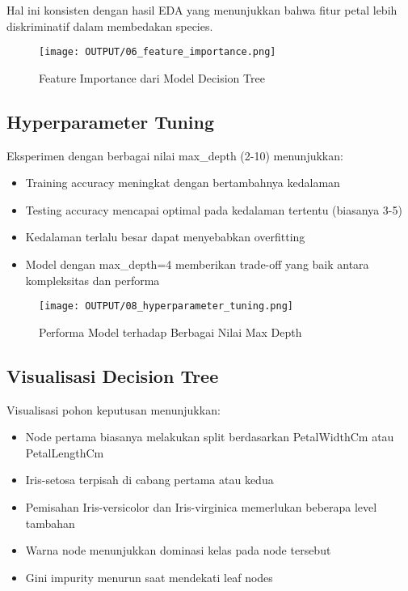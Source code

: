 \documentclass[11pt,a4paper]{article}
\begin{document}
Hal ini konsisten dengan hasil EDA yang menunjukkan bahwa fitur petal lebih diskriminatif dalam membedakan species.

\begin{figure}[h]
    \centering
    \texttt{[image: OUTPUT/06\_feature\_importance.png]}
    \caption{Feature Importance dari Model Decision Tree}
    \label{fig:feature_importance}
\end{figure}

\subsection{Hyperparameter Tuning}
Eksperimen dengan berbagai nilai max\_depth (2-10) menunjukkan:
\begin{itemize}
    \item Training accuracy meningkat dengan bertambahnya kedalaman
    \item Testing accuracy mencapai optimal pada kedalaman tertentu (biasanya 3-5)
    \item Kedalaman terlalu besar dapat menyebabkan overfitting
    \item Model dengan max\_depth=4 memberikan trade-off yang baik antara kompleksitas dan performa
\end{itemize}

\begin{figure}[h]
    \centering
    \texttt{[image: OUTPUT/08\_hyperparameter\_tuning.png]}
    \caption{Performa Model terhadap Berbagai Nilai Max Depth}
    \label{fig:hyperparameter_tuning}
\end{figure}

\subsection{Visualisasi Decision Tree}
Visualisasi pohon keputusan menunjukkan:
\begin{itemize}
    \item Node pertama biasanya melakukan split berdasarkan PetalWidthCm atau PetalLengthCm
    \item Iris-setosa terpisah di cabang pertama atau kedua
    \item Pemisahan Iris-versicolor dan Iris-virginica memerlukan beberapa level tambahan
    \item Warna node menunjukkan dominasi kelas pada node tersebut
    \item Gini impurity menurun saat mendekati leaf nodes
\end{itemize}
\end{document}
